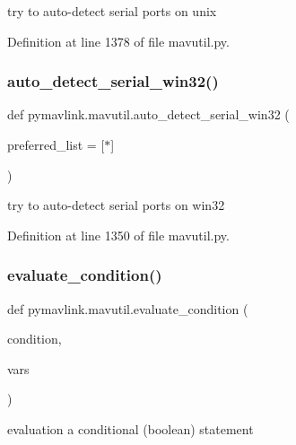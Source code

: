 \begin{DoxyVerb}try to auto-detect serial ports on unix\end{DoxyVerb}
 

Definition at line 1378 of file mavutil.\+py.

\mbox{\label{namespacepymavlink_1_1mavutil_a7fcffc8f8165b00fa7fb9c81886e66d9}} 
\subsubsection{\texorpdfstring{auto\_detect\_serial\_win32()}{auto\_detect\_serial\_win32()}}
{\footnotesize\ttfamily def pymavlink.\+mavutil.\+auto\+\_\+detect\+\_\+serial\+\_\+win32 (\begin{DoxyParamCaption}\item[{}]{preferred\+\_\+list = {\ttfamily \mbox{[}\textquotesingle{}$\ast$\textquotesingle{}\mbox{]}} }\end{DoxyParamCaption})}

\begin{DoxyVerb}try to auto-detect serial ports on win32\end{DoxyVerb}
 

Definition at line 1350 of file mavutil.\+py.

\mbox{\label{namespacepymavlink_1_1mavutil_a850b6d86829b1c79a5d58a74e8e2c3a0}} 
\subsubsection{\texorpdfstring{evaluate\_condition()}{evaluate\_condition()}}
{\footnotesize\ttfamily def pymavlink.\+mavutil.\+evaluate\+\_\+condition (\begin{DoxyParamCaption}\item[{}]{condition,  }\item[{}]{vars }\end{DoxyParamCaption})}

\begin{DoxyVerb}evaluation a conditional (boolean) statement\end{DoxyVerb}
 

